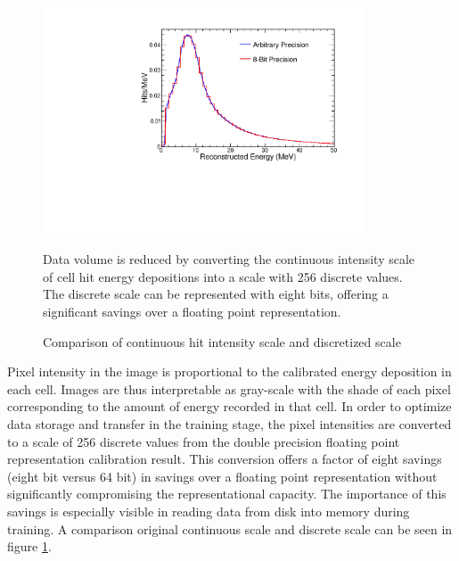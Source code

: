 \begin{figure}
\begin{center}
\includegraphics[width=0.85\textwidth]{figures/cnn/discrete_intensity.pdf}
\end{center}
\caption{Comparison of continuous hit intensity scale and discretized scale}{
Data volume is reduced by converting the continuous intensity scale of cell
hit energy depositions into a scale with 256 discrete values.
The discrete scale can be represented with eight bits, offering a significant
savings over a floating point representation.
}
\label{pixelmapadc}
\end{figure}


Pixel intensity in the image is proportional to the calibrated
energy deposition in each cell.
Images are thus interpretable as gray-scale with the shade of
each pixel corresponding to the amount of energy recorded in that cell.
In order to optimize data storage and transfer in the training stage,
the pixel intensities are converted to a scale of 256 discrete values
from the double precision floating point representation calibration result.
This conversion offers a factor of eight savings (eight bit versus 64 bit) in
savings over a floating point representation
without significantly compromising the representational capacity.
The importance of this savings is especially visible in reading data from
disk into memory during training.
A comparison original continuous scale and discrete scale can be seen in figure
\ref{pixelmapadc}.

